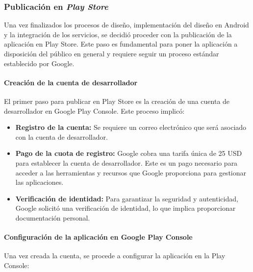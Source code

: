 
\subsubsection{Publicación en \textit{Play Store}}

Una vez finalizados los procesos de diseño, implementación del diseño en Android y la integración de los servicios, se decidió proceder con la publicación de la aplicación en Play Store. Este paso es fundamental para poner la aplicación a disposición del público en general y requiere seguir un proceso estándar establecido por Google.

\paragraph{Creación de la cuenta de desarrollador}

El primer paso para publicar en Play Store es la creación de una cuenta de desarrollador en Google Play Console. Este proceso implicó:

\begin{itemize}
    \item \textbf{Registro de la cuenta:} Se requiere un correo electrónico que será asociado con la cuenta de desarrollador. 
    \item \textbf{Pago de la cuota de registro:} Google cobra una tarifa única de 25 USD para establecer la cuenta de desarrollador. Este es un pago necesario para acceder a las herramientas y recursos que Google proporciona para gestionar las aplicaciones.
    \item \textbf{Verificación de identidad:} Para garantizar la seguridad y autenticidad, Google solicitó una verificación de identidad, lo que implica proporcionar documentación personal.
\end{itemize}

\paragraph{Configuración de la aplicación en Google Play Console}

Una vez creada la cuenta, se procede a configurar la aplicación en la Play Console:

